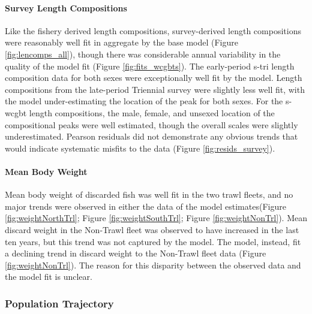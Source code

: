 \documentclass[11pt,
  english,
  letterpaper,
]{article}
\begin{document}
\hypertarget{survey-length-compositions}{%
\paragraph{Survey Length Compositions}\label{survey-length-compositions}}

Like the fishery derived length compositions, survey-derived length compositions were reasonably well fit in aggregate by the base model (Figure \ref{fig:lencomps_all}), though there was considerable annual variability in the quality of the model fit (Figure \ref{fig:fits_wcgbts}). The early-period \gls{s-tri} length composition data for both sexes were exceptionally well fit by the model. Length compositions from the late-period Triennial survey were slightly less well fit, with the model under-estimating the location of the peak for both sexes. For the \gls{s-wcgbt} length compositions, the male, female, and unsexed location of the compositional peaks were well estimated, though the overall scales were slightly underestimated. Pearson residuals did not demonstrate any obvious trends that would indicate systematic misfits to the data (Figure \ref{fig:resids_survey}).

\hypertarget{mean-body-weight}{%
\paragraph{Mean Body Weight}\label{mean-body-weight}}

Mean body weight of discarded fish was well fit in the two trawl fleets, and no major trends were observed in either the data of the model estimates(Figure \ref{fig:weightNorthTrl}; Figure \ref{fig:weightSouthTrl}; Figure \ref{fig:weightNonTrl}). Mean discard weight in the Non-Trawl fleet was observed to have increased in the last ten years, but this trend was not captured by the model. The model, instead, fit a declining trend in discard weight to the Non-Trawl fleet data (Figure \ref{fig:weightNonTrl}). The reason for this disparity between the observed data and the model fit is unclear.

\hypertarget{population-trajectory}{%
\subsubsection{Population Trajectory}\label{population-trajectory}}
\end{document}
